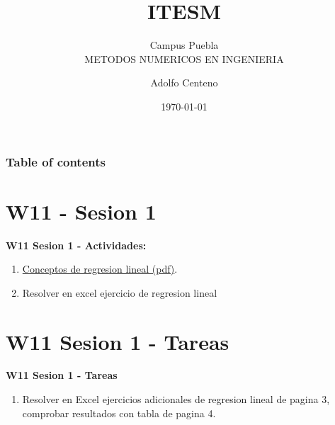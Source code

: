 \documentclass{beamer}
\begin{document}
\title{ITESM}  
\subtitle{Campus Puebla\\METODOS NUMERICOS EN INGENIERIA
}
\author{Adolfo Centeno}
\date{\today} 


\begin{frame}
\titlepage
\end{frame}

\begin{frame}\frametitle{Table of contents}
\tableofcontents
\end{frame} 


\section{W11 - Sesion 1 }

\begin{frame}

\textbf{W11 Sesion 1 - Actividades:}

\begin{enumerate}
\item
	 \href{https://github.com/adsoftsito/metodos-numericos/blob/master/w11/reglineal.pdf}{Conceptos de regresion lineal (pdf)}.

\item
	Resolver en excel ejercicio de regresion lineal

\end{enumerate} 

\end{frame}


\section{W11 Sesion 1 - Tareas }

\begin{frame}


\textbf{W11 Sesion 1 - Tareas}


\begin{enumerate}
\item

Resolver en Excel ejercicios adicionales de regresion lineal de pagina 3, comprobar resultados con tabla de pagina 4.


\end{enumerate} 


\end{frame}
\end{document}
